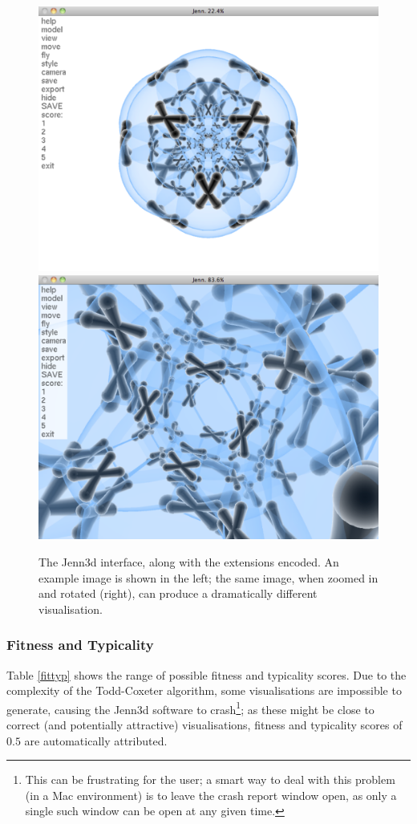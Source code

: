 \documentclass{article}
\begin{document}
\begin{figure}[ht]
	\begin{center}
		\includegraphics[width = .48\textwidth]{jennInterface1}
		\includegraphics[width = .48\textwidth]{jennInterface2}
	\end{center}
	\caption{The Jenn3d interface, along with the extensions encoded. An
	example image is shown in the left; the same image, when zoomed in
	and rotated (right), can produce a dramatically different
	visualisation.}
	\label{interface}
\end{figure}

\subsubsection{Fitness and Typicality}

Table \ref{fittyp} shows the range of possible fitness and typicality scores.
Due to the complexity of the Todd-Coxeter algorithm, some visualisations are
impossible to generate, causing the Jenn3d software to crash\footnote{This can
be frustrating for the user; a smart way to deal with this problem (in a Mac
environment) is to leave the crash report window open, as only a single such
window can be open at any given time.}; as these might be close to correct (and
potentially attractive) visualisations, fitness and typicality scores of $0.5$
are automatically attributed.
\end{document}
